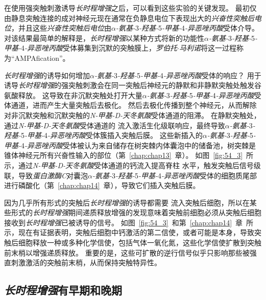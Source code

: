 在使用强突触刺激诱导\textit{长时程增强}之后，可以看到这些实验的关键发现。
最初仅由静息突触连接的成对神经元现在通常在负静息电位下表现出大的\textit{兴奋性突触后电位}，并且这些\textit{兴奋性突触后电位}由\textit{$\alpha$-氨基-}3\textit{-羟基-}5\textit{-甲基-}4\textit{-异恶唑丙酸}受体介导。
对该结果最简单的解释是，\textit{长时程增强}以某种方式将新的功能性\textit{$\alpha$-氨基-}3\textit{-羟基-}5\textit{-甲基-}4\textit{-异恶唑丙酸}受体募集到沉默的突触膜上，\textit{罗伯托$\cdot$马利诺}将这一过程称为“AMPAfication”。


\textit{长时程增强}的诱导如何增加\textit{$\alpha$-氨基-}3\textit{-羟基-}5\textit{-甲基-}4\textit{-异恶唑丙酸}受体的响应？
用于诱导\textit{长时程增强}的强突触刺激会在同一突触后神经元的静默和非静默突触处触发谷氨酸释放。
这导致在非沉默突触处打开大量\textit{$\alpha$-氨基-}3\textit{-羟基-}5\textit{-甲基-}4\textit{-异恶唑丙酸}受体通道，进而产生大量突触后去极化。
然后去极化传播到整个神经元，从而解除  对非沉默突触和沉默突触的\textit{N-甲基-D-天冬氨酸}受体通道的阻滞。
在静默突触处，通过\textit{N-甲基-D-天冬氨酸}受体通道的  流入激活生化级联响应，最终导致\textit{$\alpha$-氨基-}3\textit{-羟基-}5\textit{-甲基-}4\textit{-异恶唑丙酸}受体簇插入突触后膜。
这些新插入的\textit{$\alpha$-氨基-}3\textit{-羟基-}5\textit{-甲基-}4\textit{-异恶唑丙酸}受体被认为来自储存在树突棘内体囊泡中的储备池，树突棘是锥体神经元所有兴奋性输入的部位（第~\ref{chap:chap13}~章）。
如图~\ref{fig:54_3}~所示，通过\textit{N-甲基-D-天冬氨酸}受体通道的钙流入提高脊柱  水平，触发突触后信号级联，导致\textit{蛋白激酶C}对囊泡\textit{$\alpha$-氨基-}3\textit{-羟基-}5\textit{-甲基-}4\textit{-异恶唑丙酸}受体的细胞质尾部进行磷酸化（第~\ref{chap:chap14}~章），导致它们插入突触后膜。


因为几乎所有形式的突触后\textit{长时程增强}的诱导都需要  流入突触后细胞，所以在某些形式的\textit{长时程增强}期间递质释放增强的发现意味着突触前细胞必须从突触后细胞接收到\textit{长时程增强}已被诱导的信号。
如图~\ref{fig:54_3}~和第~\ref{chap:chap14}~章~所示，现在有证据表明，突触后细胞中钙激活的第二信使，或者可能是本身，导致突触后细胞释放一种或多种化学信使，包括气体一氧化氮，这些化学信使扩散到突触前末梢以增强递质释放。
重要的是，这些可扩散的逆行信号似乎只影响那些被强直刺激激活的突触前末梢，从而保持突触特异性。



\subsection{\textit{长时程增强}有早期和晚期}

